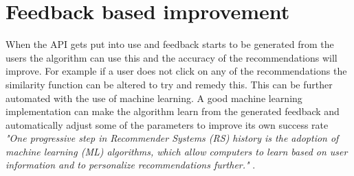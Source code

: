 \section{Feedback based improvement}
When the API gets put into use and feedback starts to be generated from the users the algorithm can use this and the accuracy of the recommendations will improve. For example if a user does not click on any of the recommendations the similarity function can be altered to try and remedy this. This can be further automated with the use of machine learning. A good machine learning implementation can make the algorithm learn from the generated feedback and automatically adjust some of the parameters to improve its own success rate \textit{"One  progressive  step  in  Recommender Systems (RS) history  is  the  adoption  of  machine  learning  (ML) algorithms, which allow computers to learn based on user information and to personalize recommendations  further."} \cite{RSAndML}. 

